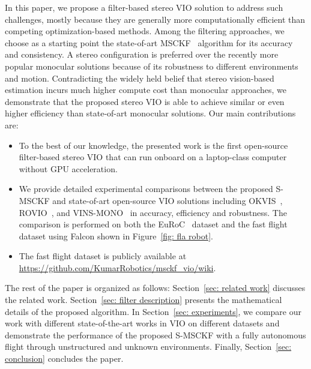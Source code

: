 In this paper, we propose a filter-based stereo VIO solution to address such challenges, mostly because they are generally more computationally efficient than competing optimization-based methods. Among the filtering approaches, we choose as a starting point the state-of-art MSCKF~\cite{mourikis2007multi,li2013high,li2013optimization} algorithm for its accuracy and consistency. A stereo configuration is preferred over the recently more popular monocular solutions because of its robustness to different environments and motion. Contradicting the widely held belief that stereo vision-based estimation incurs much higher compute cost than monocular approaches, we demonstrate that the proposed stereo VIO is able to achieve similar or even higher efficiency than state-of-art monocular solutions. Our main contributions are:
\begin{itemize}
\item To the best of our knowledge, the presented work is the first open-source filter-based stereo VIO that can run onboard on a laptop-class computer without GPU acceleration. 
\item We provide detailed experimental comparisons between the proposed S-MSCKF and state-of-art open-source VIO solutions including OKVIS~\cite{leutenegger2015keyframe}, ROVIO~\cite{bloesch2015robust}, and VINS-MONO~\cite{vins-mono} in accuracy, efficiency and robustness. The comparison is performed on both the EuRoC~\cite{burri2016euroc} dataset and the fast flight dataset using {\sc Falcon} shown in Figure~\ref{fig: fla robot}. 
\item The fast flight dataset is publicly available at \url{https://github.com/KumarRobotics/msckf_vio/wiki}.
\end{itemize}

%
%
The rest of the paper is organized as follows: Section~\ref{sec: related work} discusses the related work. Section~\ref{sec: filter description} presents the mathematical details of the proposed algorithm. In Section~\ref{sec: experiments}, we compare our work with different state-of-the-art works in VIO on different datasets and demonstrate the performance of the proposed S-MSCKF with a fully autonomous flight through unstructured and unknown environments. Finally, Section~\ref{sec: conclusion} concludes the paper.